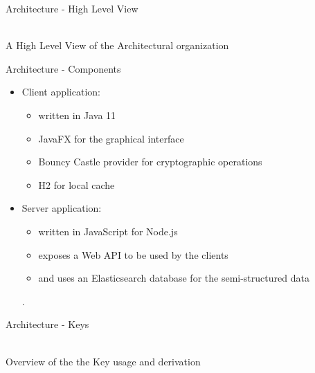 \documentclass[newPxFont,noprogressbar,table]{beamer}
\begin{document}








\iffalse

\begin{frame}{Architecture - High Level View}

\vspace*{-2em}
\centering
{}\\
A High Level View of the Architectural organization
\end{frame}

\begin{frame}{Architecture - Components }

\vspace*{-4em} 

\begin{itemize}
\item \textcolor{sthlmBlue}{Client application:}
	\begin{itemize}
	\item written in Java 11
	\item JavaFX for the graphical interface
	\item Bouncy Castle provider for cryptographic operations
	\item H2 for local cache
	\end{itemize}
\item \textcolor{sthlmBlue}{Server application:}  
	\begin{itemize}
	\item written in JavaScript for Node.js
	\item exposes a Web API to be used by the clients
	\item and uses an Elasticsearch database for the semi-structured data
	\end{itemize}
.   
\end{itemize}

\end{frame}

\begin{frame}{Architecture - Keys}

\vspace*{-2.5em}
\centering
{}\\
Overview of the the Key usage and derivation

\end{frame}
\end{document}

